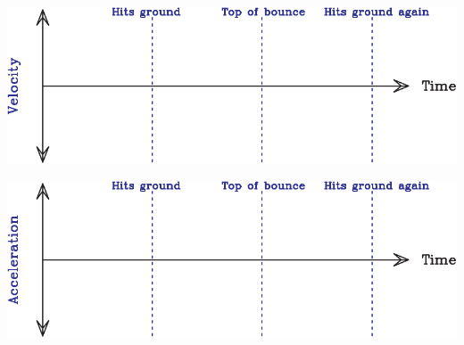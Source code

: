 \documentclass[12pt]{article}
\begin{document}
\begin{enumerate}
\begin{center}
	\vspace{0.4in}
	
	\includegraphics[width=\textwidth]{velocity-crop.pdf}
	
	\vspace{0.4in}
	
	\includegraphics[width=\textwidth]{acceleration-crop.pdf}
\end{center}








\newpage



\end{enumerate}
\end{document}
